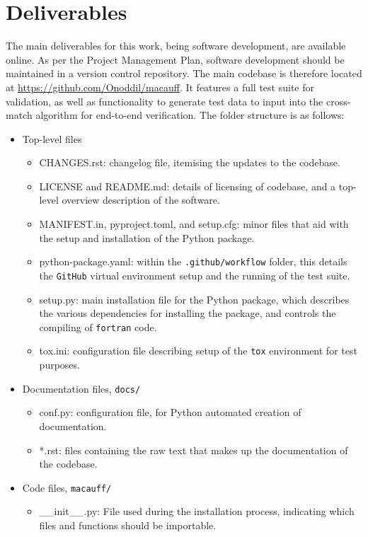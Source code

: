 \documentclass[a4paper,11pt]{scrartcl}
\begin{document}
\section{Deliverables}
The main deliverables for this work, being software development, are available online.
As per the Project Management Plan, software development should be maintained in a version control repository.
The main codebase is therefore located at \href{https://github.com/Onoddil/macauff/tree/7891efc9e5edc30febb2d3bcfdb14e97252493d0}{https://github.com/Onoddil/macauff}.
It features a full test suite for validation, as well as functionality to generate test data to input into the cross-match algorithm for end-to-end verification.
The folder structure is as follows:
\begin{itemize}
	\item Top-level files
	\begin{itemize}
		\item CHANGES.rst: changelog file, itemising the updates to the codebase.
		\item LICENSE and README.md: details of licensing of codebase, and a top-level overview description of the software.
		\item MANIFEST.in, pyproject.toml, and setup.cfg: minor files that aid with the setup and installation of the Python package.
		\item python-package.yaml: within the \texttt{.github/workflow} folder, this details the \texttt{GitHub} virtual environment setup and the running of the test suite.
		\item setup.py: main installation file for the Python package, which describes the various dependencies for installing the package, and controls the compiling of \texttt{fortran} code.
		\item tox.ini: configuration file describing setup of the \texttt{tox} environment for test purposes.
	\end{itemize}
	\item Documentation files, \texttt{docs/}
	\begin{itemize}
		\item conf.py: configuration file, for Python automated creation of documentation.
		\item *.rst: files containing the raw text that makes up the documentation of the codebase.
	\end{itemize}
	\item Code files, \texttt{macauff/}
	\begin{itemize}
		\item \_\_init\_\_.py: File used during the installation process, indicating which files and functions should be importable.

\end{itemize}
\end{itemize}
\end{document}
